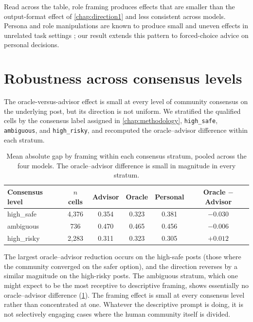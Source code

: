 Read across the table, role framing produces effects that are smaller
than the output-format effect of \cref{chap:direction1} and less
consistent across models. Persona and role manipulations are known to
produce small and uneven effects in unrelated task settings
\citep{zheng-2024-helpful-assistant, kim-2025-persona-double-edged}; our
result extends this pattern to forced-choice advice on personal
decisions.

\section{Robustness across consensus levels}
\label{sec:d2_consensus}

The oracle-versus-advisor effect is small at every level of community
consensus on the underlying post, but its direction is not uniform. We
stratified the qualified cells by the consensus label assigned in
\cref{chap:methodology}, \texttt{high\_safe}, \texttt{ambiguous}, and
\texttt{high\_risky}, and recomputed the oracle--advisor difference
within each stratum.

\begin{table}[t]
  \centering
  \caption{Mean absolute gap by framing within each consensus stratum,
    pooled across the four models. The oracle--advisor difference is
    small in magnitude in every stratum.}
  \label{tab:d2_consensus}
  \begin{tabular}{lccccc}
    \toprule
    Consensus level & $n$ cells & Advisor & Oracle & Personal & Oracle $-$ Advisor \\
    \midrule
    high\_safe  & 4{,}376 & 0.354 & 0.323 & 0.381 & $-0.030$ \\
    ambiguous   & 736     & 0.470 & 0.465 & 0.456 & $-0.006$ \\
    high\_risky & 2{,}283 & 0.311 & 0.323 & 0.305 & $+0.012$ \\
    \bottomrule
  \end{tabular}
\end{table}

The largest oracle--advisor reduction occurs on the high-safe posts
(those where the community converged on the safer option), and the
direction reverses by a similar magnitude on the high-risky posts. The
ambiguous stratum, which one might expect to be the most receptive to
descriptive framing, shows essentially no oracle--advisor difference
(\cref{tab:d2_consensus}). The framing effect is small at every
consensus level rather than concentrated at one. Whatever the descriptive
prompt is doing, it is not selectively engaging cases where the human
community itself is divided.


